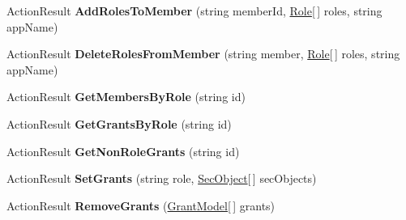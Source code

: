 \begin{DoxyCompactItemize}
Action\+Result {\bfseries Add\+Roles\+To\+Member} (string member\+Id, \hyperlink{class_security_1_1_model_1_1_role}{Role}\mbox{[}$\,$\mbox{]} roles, string app\+Name)
\item 
\mbox{\label{class_security_1_1_manager_1_1_controllers_1_1_security_controller_a154b43da18a90272072ffe54da583537}} 
Action\+Result {\bfseries Delete\+Roles\+From\+Member} (string member, \hyperlink{class_security_1_1_model_1_1_role}{Role}\mbox{[}$\,$\mbox{]} roles, string app\+Name)
\item 
\mbox{\label{class_security_1_1_manager_1_1_controllers_1_1_security_controller_a0164e4f39f39fcd81277300393f91afc}} 
Action\+Result {\bfseries Get\+Members\+By\+Role} (string id)
\item 
\mbox{\label{class_security_1_1_manager_1_1_controllers_1_1_security_controller_aaa3e19bc443a62f4cf70948123119112}} 
Action\+Result {\bfseries Get\+Grants\+By\+Role} (string id)
\item 
\mbox{\label{class_security_1_1_manager_1_1_controllers_1_1_security_controller_ab11f07fdb2e77cc2d2322c6af68121f6}} 
Action\+Result {\bfseries Get\+Non\+Role\+Grants} (string id)
\item 
\mbox{\label{class_security_1_1_manager_1_1_controllers_1_1_security_controller_a2357c0c73e31a5ac86a5040246804ba2}} 
Action\+Result {\bfseries Set\+Grants} (string role, \hyperlink{class_security_1_1_model_1_1_sec_object}{Sec\+Object}\mbox{[}$\,$\mbox{]} sec\+Objects)
\item 
\mbox{\label{class_security_1_1_manager_1_1_controllers_1_1_security_controller_a869ba823464c104f14251eac2fbebae9}} 
Action\+Result {\bfseries Remove\+Grants} (\hyperlink{class_security_1_1_manager_1_1_models_1_1_security_1_1_grant_model}{Grant\+Model}\mbox{[}$\,$\mbox{]} grants)
\item 
\mbox{\label{class_security_1_1_manager_1_1_controllers_1_1_security_controller_af4785f12cf106649d6133bc990791950}} 

\end{DoxyCompactItemize}
